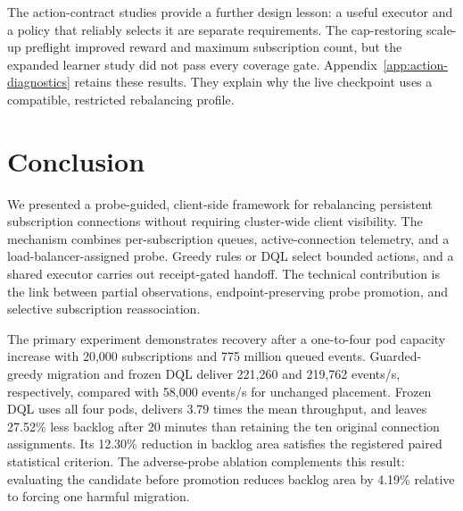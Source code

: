 \documentclass[manuscript,nonacm]{acmart}
\begin{document}
The action-contract studies provide a further design lesson: a useful
executor and a policy that reliably selects it are separate requirements.
The cap-restoring scale-up preflight improved reward and maximum subscription
count, but the expanded learner study did not pass every coverage gate.
Appendix~\ref{app:action-diagnostics} retains these results. They explain why
the live checkpoint uses a compatible, restricted rebalancing profile.

\section{Conclusion}

We presented a probe-guided, client-side framework for rebalancing
persistent subscription connections without requiring cluster-wide client
visibility.  The mechanism combines per-subscription queues, active-connection
telemetry, and a load-balancer-assigned probe. Greedy rules or DQL select
bounded actions, and a shared executor carries out receipt-gated handoff.
The technical contribution is the link between partial observations,
endpoint-preserving probe promotion, and selective subscription reassociation.

The primary experiment demonstrates recovery after a one-to-four pod capacity
increase with 20,000 subscriptions and 775 million queued events. Guarded-greedy
migration and frozen DQL deliver 221,260 and 219,762 events/s, respectively,
compared with 58,000 events/s for unchanged placement. Frozen DQL
uses all four pods, delivers 3.79 times the mean throughput, and leaves 27.52\%
less backlog after 20 minutes than retaining the ten original connection
assignments. Its 12.30\% reduction in backlog area satisfies the registered
paired statistical criterion. The adverse-probe ablation complements this
result: evaluating the candidate before promotion reduces backlog area by
4.19\% relative to forcing one harmful migration.
\end{document}
